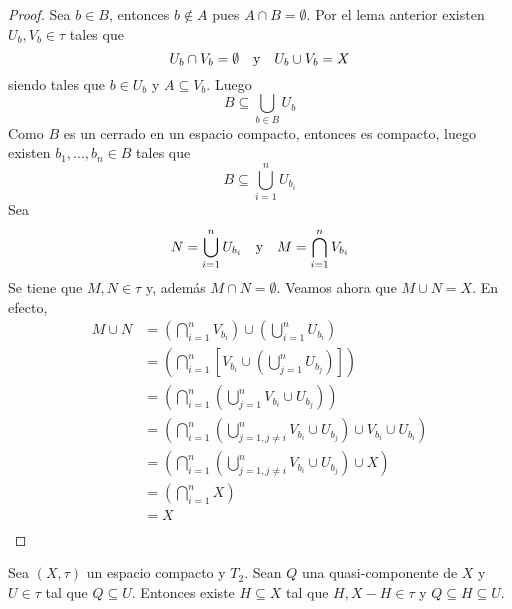 \documentclass[12pt]{report}
\theoremstyle{largebreak}
\begin{document}
    \begin{proof}
        Sea $b\in B$, entonces $b\notin A$ pues $A\cap B=\emptyset$. Por el lema anterior existen $U_b,V_b\in\tau$ tales que
        \begin{equation*}
            U_b\cap V_b=\emptyset\quad\textup{y}\quad U_b\cup V_b=X
        \end{equation*}
        siendo tales que $b\in U_b$ y $A\subseteq V_b$. Luego
        \begin{equation*}
            B\subseteq\bigcup_{ b\in B}U_b
        \end{equation*}
        Como $B$ es un cerrado en un espacio compacto, entonces es compacto, luego existen $b_1,...,b_n\in B$ tales que
        \begin{equation*}
            B\subseteq\bigcup_{ i=1}^n U_{b_i}
        \end{equation*}
        Sea
        \begin{equation*}
            N=\bigcup_{ i=1}^n U_{b_i}\quad\textup{y}\quad M=\bigcap_{ i=1}^n V_{ b_i}
        \end{equation*}
        Se tiene que $M,N\in\tau$ y, además $M\cap N=\emptyset$. Veamos ahora que $M\cup N=X$. En efecto,
        \begin{equation*}
            \begin{split}
                M\cup N&=\left(\bigcap_{ i=1}^n V_{ b_i}\right)\cup\left(\bigcup_{ i=1}^n U_{b_i}\right)\\
                &=\left(\bigcap_{ i=1}^n\left[V_{ b_i}\cup\left(\bigcup_{ j=1}^n U_{b_j}\right)\right]\right)\\
                &=\left(\bigcap_{ i=1}^n\left(\bigcup_{ j=1}^n V_{ b_i}\cup U_{b_j}\right)\right)\\
                &=\left(\bigcap_{ i=1}^n\left(\bigcup_{ j=1, j\neq i}^n V_{ b_i}\cup U_{b_j}\right)\cup V_{ b_i}\cup U_{ b_i} \right)\\
                &=\left(\bigcap_{ i=1}^n\left(\bigcup_{ j=1, j\neq i}^n V_{ b_i}\cup U_{b_j}\right)\cup X \right)\\
                &=\left(\bigcap_{ i=1}^n X \right)\\
                &=X\\
            \end{split}
        \end{equation*}
    \end{proof}

    \begin{lema}
        Sea $(X,\tau)$ un espacio compacto y $T_2$. Sean $Q$ una quasi-componente de $X$ y $U\in\tau$ tal que $Q\subseteq U$. Entonces existe $H\subseteq X$ tal que $H,X-H\in\tau$ y $Q\subseteq H\subseteq U$.
    \end{lema}
\end{document}
